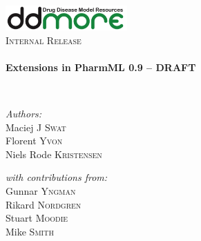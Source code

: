 \begin{titlepage}
\begin{center}

\includegraphics[width=0.35\textwidth]{./logo/ddmore_logo}~\\[1cm]

%
\textsc{\Large Internal Release}\\[0.5cm]

\HRule \\[0.4cm]
{ \huge \bfseries Extensions in PharmML 0.9 -- DRAFT \\[0.4cm] }

\HRule \\[1.5cm]

\begin{minipage}{0.5\textwidth}
\begin{flushleft} \large
\emph{Authors:}\\
Maciej J \textsc{Swat}\\
Florent \textsc{Yvon}\\
Niels Rode \textsc{Kristensen}\\
\end{flushleft}
\end{minipage}
\begin{minipage}{0.4\textwidth}
\begin{flushright} \large
\emph{with contributions from:} \\
Gunnar \textsc{Yngman} \\
Rikard \textsc{Nordgren} \\
Stuart \textsc{Moodie} \\
Mike \textsc{Smith} \\
\end{flushright}
\end{minipage}


\end{center}
\end{titlepage}
